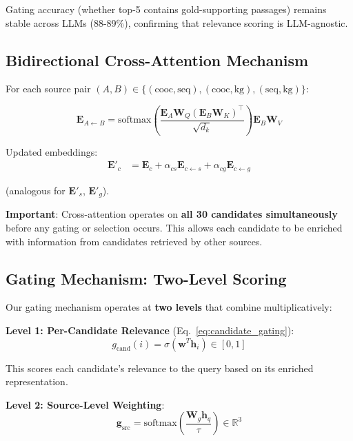 \documentclass[10pt,twocolumn]{article}
\begin{document}
Gating accuracy (whether top-5 contains gold-supporting passages) remains stable across LLMs (88-89\%), confirming that relevance scoring is LLM-agnostic.



\subsection{Bidirectional Cross-Attention Mechanism}
\label{sec:bidirectional}

For each source pair $(A, B) \in \{(\text{cooc}, \text{seq}), (\text{cooc}, \text{kg}), (\text{seq}, \text{kg})\}$:

\begin{equation}
\mathbf{E}_{A \leftarrow B} = \text{softmax}\left(\frac{\mathbf{E}_A \mathbf{W}_Q (\mathbf{E}_B \mathbf{W}_K)^\top}{\sqrt{d_k}}\right) \mathbf{E}_B \mathbf{W}_V
\end{equation}

Updated embeddings:
\begin{align}
\mathbf{E}'_c &= \mathbf{E}_c + \alpha_{cs}\mathbf{E}_{c \leftarrow s} + \alpha_{cg}\mathbf{E}_{c \leftarrow g}
\end{align}

(analogous for $\mathbf{E}'_s$, $\mathbf{E}'_g$).

\textbf{Important}: Cross-attention operates on \textbf{all 30 candidates simultaneously} before any gating or selection occurs. This allows each candidate to be enriched with information from candidates retrieved by other sources.


\subsection{Gating Mechanism: Two-Level Scoring}
\label{sec:gating}

Our gating mechanism operates at \textbf{two levels} that combine multiplicatively:

\textbf{Level 1: Per-Candidate Relevance} (Eq.~\ref{eq:candidate_gating}):
\begin{equation}
g_{\text{cand}}(i) = \sigma(\mathbf{w}^T \mathbf{h}_i) \in [0, 1]
\end{equation}

This scores each candidate's relevance to the query based on its enriched representation.

\textbf{Level 2: Source-Level Weighting}:
\begin{equation}
\mathbf{g}_{\text{src}} = \text{softmax}\left( \frac{\mathbf{W}_g \mathbf{h}_q}{\tau} \right) \in \mathbb{R}^3
\label{eq:source_gating}
\end{equation}
\end{document}
